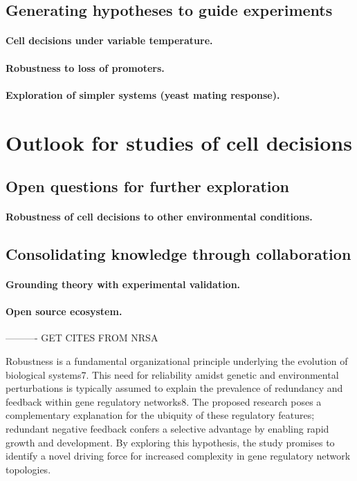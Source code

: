 	\subsection{Generating hypotheses to guide experiments}
		\paragraph{Cell decisions under variable temperature.}		
		\paragraph{Robustness to loss of promoters.}
		\paragraph{Exploration of simpler systems (yeast mating response).}
		
\section{Outlook for studies of cell decisions}

	\subsection{Open questions for further exploration}
		\paragraph{Robustness of cell decisions to other environmental conditions.}	
					
	\subsection{Consolidating knowledge through collaboration}
	
		\paragraph{Grounding theory with experimental validation.}		
		\paragraph{Open source ecosystem.}




---------- GET CITES FROM NRSA

Robustness is a fundamental organizational principle underlying the evolution of biological systems7. This need for reliability amidst genetic and environmental perturbations is typically assumed to explain the prevalence of redundancy and feedback within gene regulatory networks8. The proposed research poses a complementary explanation for the ubiquity of these regulatory features; redundant negative feedback confers a selective advantage by enabling rapid growth and development. By exploring this hypothesis, the study promises to identify a novel driving force for increased complexity in gene regulatory network topologies. 



